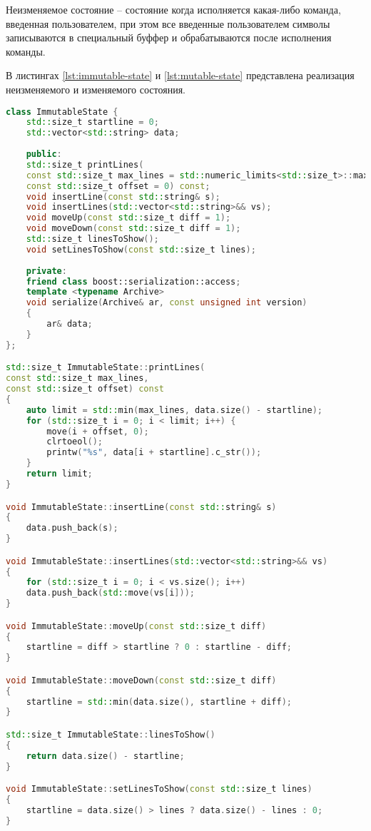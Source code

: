Неизменяемое состояние -- состояние когда исполняется какая-либо команда, введенная пользователем, при этом все введенные пользователем символы записываются в специальный буффер и обрабатываются после исполнения команды.

В листингах \ref{lst:immutable-state} и \ref{lst:mutable-state} представлена реализация неизменяемого и изменяемого состояния.\\

\begin{lstlisting}[label=lst:immutable-state,caption=Класс\, описывающий неизменяемое состояние системы,language=c++]
class ImmutableState {
	std::size_t startline = 0;
	std::vector<std::string> data;
	
	public:
	std::size_t printLines(
	const std::size_t max_lines = std::numeric_limits<std::size_t>::max(),
	const std::size_t offset = 0) const;
	void insertLine(const std::string& s);
	void insertLines(std::vector<std::string>&& vs);
	void moveUp(const std::size_t diff = 1);
	void moveDown(const std::size_t diff = 1);
	std::size_t linesToShow();
	void setLinesToShow(const std::size_t lines);
	
	private:
	friend class boost::serialization::access;
	template <typename Archive>
	void serialize(Archive& ar, const unsigned int version)
	{
		ar& data;
	}
};

std::size_t ImmutableState::printLines(
const std::size_t max_lines,
const std::size_t offset) const
{
	auto limit = std::min(max_lines, data.size() - startline);
	for (std::size_t i = 0; i < limit; i++) {
		move(i + offset, 0);
		clrtoeol();
		printw("%s", data[i + startline].c_str());
	}
	return limit;
}

void ImmutableState::insertLine(const std::string& s)
{
	data.push_back(s);
}

void ImmutableState::insertLines(std::vector<std::string>&& vs)
{
	for (std::size_t i = 0; i < vs.size(); i++)
	data.push_back(std::move(vs[i]));
}

void ImmutableState::moveUp(const std::size_t diff)
{
	startline = diff > startline ? 0 : startline - diff;
}

void ImmutableState::moveDown(const std::size_t diff)
{
	startline = std::min(data.size(), startline + diff);
}

std::size_t ImmutableState::linesToShow()
{
	return data.size() - startline;
}

void ImmutableState::setLinesToShow(const std::size_t lines)
{
	startline = data.size() > lines ? data.size() - lines : 0;
}
\end{lstlisting}

